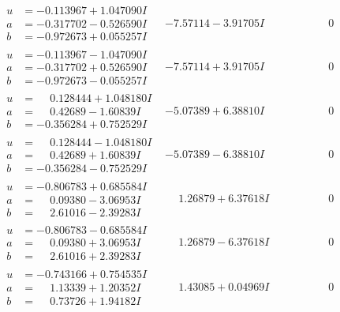 \documentclass[1p]{elsarticle_modified}
\theoremstyle{definition}
\begin{document}
$$\begin{array}{c|c|c}
\begin{aligned}
u &= -0.113967 + 1.047090 I \\
a &= -0.317702 - 0.526590 I \\
b &= -0.972673 + 0.055257 I\end{aligned}
 & -7.57114 - 3.91705 I & \phantom{-0.000000 } 0 \\ \hline\begin{aligned}
u &= -0.113967 - 1.047090 I \\
a &= -0.317702 + 0.526590 I \\
b &= -0.972673 - 0.055257 I\end{aligned}
 & -7.57114 + 3.91705 I & \phantom{-0.000000 } 0 \\ \hline\begin{aligned}
u &= \phantom{-}0.128444 + 1.048180 I \\
a &= \phantom{-}0.42689 - 1.60839 I \\
b &= -0.356284 + 0.752529 I\end{aligned}
 & -5.07389 + 6.38810 I & \phantom{-0.000000 } 0 \\ \hline\begin{aligned}
u &= \phantom{-}0.128444 - 1.048180 I \\
a &= \phantom{-}0.42689 + 1.60839 I \\
b &= -0.356284 - 0.752529 I\end{aligned}
 & -5.07389 - 6.38810 I & \phantom{-0.000000 } 0 \\ \hline\begin{aligned}
u &= -0.806783 + 0.685584 I \\
a &= \phantom{-}0.09380 - 3.06953 I \\
b &= \phantom{-}2.61016 - 2.39283 I\end{aligned}
 & \phantom{-}1.26879 + 6.37618 I & \phantom{-0.000000 } 0 \\ \hline\begin{aligned}
u &= -0.806783 - 0.685584 I \\
a &= \phantom{-}0.09380 + 3.06953 I \\
b &= \phantom{-}2.61016 + 2.39283 I\end{aligned}
 & \phantom{-}1.26879 - 6.37618 I & \phantom{-0.000000 } 0 \\ \hline\begin{aligned}
u &= -0.743166 + 0.754535 I \\
a &= \phantom{-}1.13339 + 1.20352 I \\
b &= \phantom{-}0.73726 + 1.94182 I\end{aligned}
 & \phantom{-}1.43085 + 0.04969 I & \phantom{-0.000000 } 0 \\ \hline\begin{aligned}

\end{aligned}
\end{array}$$
\end{document}
